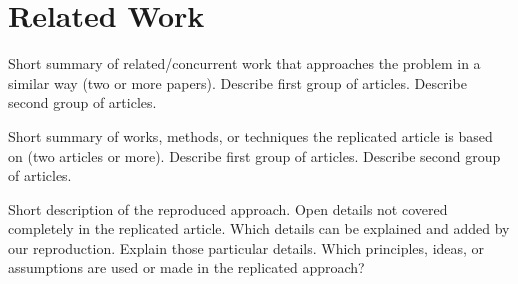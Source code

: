 \section{Related Work} %



Short summary of related/concurrent work that approaches the problem in a similar way (two or more papers).
Describe first group of articles.
Describe second group of articles.

Short summary of works, methods, or techniques the replicated article is based on (two articles or more).
Describe first group of articles.
Describe second group of articles.

Short description of the reproduced approach.
Open details not covered completely in the replicated article.
Which details can be explained and added by our reproduction.
Explain those particular details.
Which principles, ideas, or assumptions are used or made in the replicated approach?
